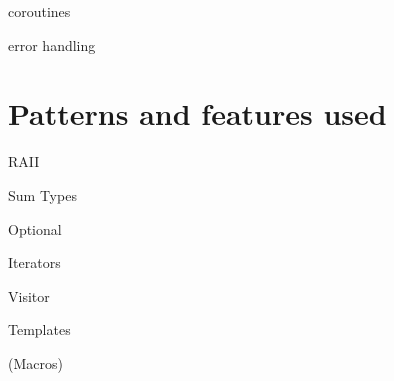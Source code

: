             coroutines %
            
            error handling
    
    \section{Patterns and features used}
    
        RAII
        
        Sum Types
        
        Optional
        
        Iterators
        
        Visitor
        
        Templates
        
        (Macros)
